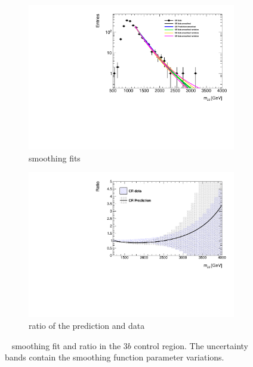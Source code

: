 \begin{figure}[htb!]
\begin{center}
    \captionsetup{justification=centering}
    \hspace{-3cm}
    \begin{subfigure}[b]{0.33\textwidth}
        \includegraphics[width=\textwidth,angle=-90]{figures/boosted/Syst_Shape/QCDSysfitSmooth_33.pdf}
        \caption{smoothing fits}
        \label{fig:qcd_shape_fit_33_fit}
    \end{subfigure}
    \quad \quad \quad \quad \quad
    \begin{subfigure}[b]{0.33\textwidth}
        \includegraphics[width=\textwidth,angle=-90]{figures/boosted/Syst_Shape/QCDSysfitSmooth_ratio_33.pdf}
        \caption{ratio of the prediction and data}
        \label{fig:qcd_shape_fit_33_ratio}
    \end{subfigure}
  \caption{\mtwoJ~ smoothing fit and ratio in the $3b$ control region. The uncertainty bands contain the smoothing function parameter variations.}
  \label{fig:qcd_shape_fit_33}
\end{center}
\end{figure}

